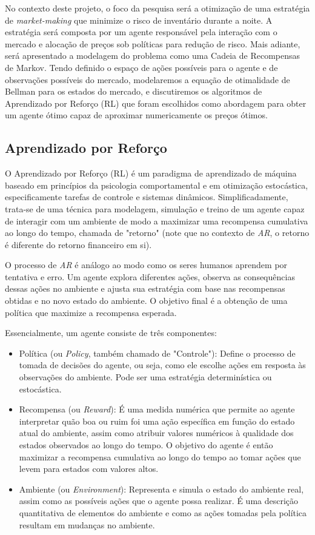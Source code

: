 No contexto deste projeto, o foco da pesquisa será a otimização de uma estratégia de \textit{market-making} que minimize o risco de inventário durante a noite. A estratégia será composta por um agente responsável pela interação com o mercado e alocação de preços sob políticas para redução de risco. Mais adiante, será apresentado a modelagem do problema como uma Cadeia de Recompensas de Markov. Tendo definido o espaço de ações possíveis para o agente e de observações possíveis do mercado, modelaremos a equação de otimalidade de Bellman para os estados do mercado, e discutiremos os algoritmos de Aprendizado por Reforço (RL) que foram escolhidos como abordagem para obter um agente ótimo capaz de aproximar numericamente os preços ótimos.

\subsection{Aprendizado por Reforço}
O Aprendizado por Reforço (RL) é um paradigma de aprendizado de máquina baseado em princípios da psicologia comportamental e em otimização estocástica, especificamente tarefas de controle e sistemas dinâmicos. Simplificadamente, trata-se de uma técnica para modelagem, simulação e treino de um agente capaz de interagir com um ambiente de modo a maximizar uma recompensa cumulativa ao longo do tempo, chamada de "retorno" (note que no contexto de \textit{AR}, o retorno é diferente do retorno financeiro em si).

O processo de \textit{AR} é análogo ao modo como os seres humanos aprendem por tentativa e erro. Um agente explora diferentes ações, observa as consequências dessas ações no ambiente e ajusta sua estratégia com base nas recompensas obtidas e no novo estado do ambiente. O objetivo final é a obtenção de uma política que maximize a recompensa esperada.

Essencialmente, um agente consiste de três componentes:

\begin{itemize}
\item Política (ou \textit{Policy}, também chamado de "Controle"): Define o processo de tomada de decisões do agente, ou seja, como ele escolhe ações em resposta às observações do ambiente. Pode ser uma estratégia determinística ou estocástica.

\item Recompensa (ou \textit{Reward}): É uma medida numérica que permite ao agente interpretar quão boa ou ruim foi uma ação específica em função do estado atual do ambiente, assim como atribuir valores numéricos à qualidade dos estados observados ao longo do tempo. O objetivo do agente é então maximizar a recompensa cumulativa ao longo do tempo ao tomar ações que levem para estados com valores altos.

\item Ambiente (ou \textit{Environment}): Representa e simula o estado do ambiente real, assim como as possíveis ações que o agente possa realizar. É uma descrição quantitativa de elementos do ambiente e como as ações tomadas pela política resultam em mudanças no ambiente.
\end{itemize}


